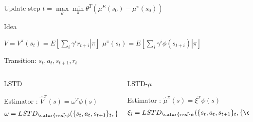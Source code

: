 \documentclass[xcolor=x11names,12pt]{beamer}
\begin{document}
\begin{frame}
\begin{columns}
    \begin{column}{.48\textwidth}
\begin{block}{Update step}
  $t = \max\limits_{\theta}\min\limits_{\pi}\theta^T(\mu^{E}(s_0)-\mu^{\pi}(s_0))$
\end{block}

      \begin{block}{Idea}
        
        $V = V^\pi(s_t) = E\left[\left.\sum\limits_{i}\gamma^i r_{t+i}\right|\pi\right]$
        \hfill $\mu^\pi(s_t) = E\left[\left.\sum\limits_i\gamma^i\phi(s_{t+i})\right|\pi\right]$ \\
        \begin{center}
          Transition: $s_t,a_t,s_{t+1},r_t$
        \end{center}
      \end{block}
\begin{columns}
\begin{column}{.5\textwidth}
\begin{block}{LSTD}
\label{sec-3_2_1_2}

     Estimator : $\hat V^\pi(s) = \omega^T\phi(s)$
     \begin{equation*}
     \omega = LSTD_{\color{red}\phi}( \{s_t,a_t,s_{t+1}\}_t,\{{\color{red}r_t}\}_t)
     \end{equation*}
\end{block}
\end{column}
\begin{column}{.5\textwidth}
\begin{block}{LSTD-$\mu$}
\label{sec-3_2_1_3}

     Estimator : $\hat \mu^\pi(s) = \xi^{T}\psi(s)$
     \begin{equation*}
     \xi_i = LSTD_{\color{red}\psi}( \{s_t,a_t,s_{t+1}\}_t, \{{\color{red}\phi_i(s_t)}\}_t )
     \end{equation*}
\end{block}
\end{column}
\end{columns}


\end{column}
\end{columns}
\end{frame}
\end{document}
